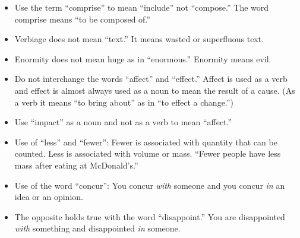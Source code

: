 \begin{itemize}
\item Use the term ``comprise'' to mean ``include'' not ``compose.'' The word comprise means ``to be composed of.''
\item Verbiage does not mean ``text.'' It means wasted or superfluous text.
\item Enormity does not mean huge as in ``enormous.'' Enormity means evil.
\item Do not interchange the words ``affect'' and ``effect.'' Affect is used as a verb and effect is almost always used as a noun to mean the result of a cause. (As a verb it means ``to bring about'' as in ``to effect a change.'') 
\item Use ``impact'' as a noun and not as a verb to mean ``affect.''
\item Use of ``less'' and ``fewer'': Fewer is associated with quantity that can be counted. Less is associated with volume or mass. ``Fewer people have less mass after eating at McDonald's.''
\item Use of the word ``concur'': You concur \emph{with} someone and you concur \emph{in} an idea or an opinion. 
\item The opposite holds true with the word ``disappoint.'' You are disappointed \emph{with} something and disappointed \emph{in} someone.
\end{itemize}



